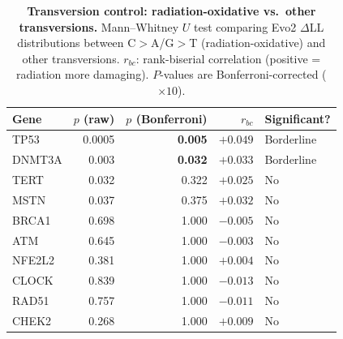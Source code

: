 \documentclass[11pt]{article}
\begin{document}
\begin{table}[h]
  \centering
  \caption{\textbf{Transversion control: radiation-oxidative vs.\ other transversions.}
    Mann--Whitney $U$ test comparing Evo2 $\Delta$LL distributions between
    C$>$A/G$>$T (radiation-oxidative) and other transversions. $r_{bc}$: rank-biserial
    correlation (positive = radiation more damaging). $P$-values are Bonferroni-corrected
    ($\times 10$).}
  \label{tab:transversion}
  \small
  \begin{tabular}{lrrrl}
    \toprule
    Gene & $p$ (raw) & $p$ (Bonferroni) & $r_{bc}$ & Significant? \\
    \midrule
    TP53   & 0.0005 & \textbf{0.005} & $+0.049$ & Borderline \\
    DNMT3A & 0.003  & \textbf{0.032} & $+0.033$ & Borderline \\
    TERT   & 0.032  & 0.322          & $+0.025$ & No \\
    MSTN   & 0.037  & 0.375          & $+0.032$ & No \\
    BRCA1  & 0.698  & 1.000          & $-0.005$ & No \\
    ATM    & 0.645  & 1.000          & $-0.003$ & No \\
    NFE2L2 & 0.381  & 1.000          & $+0.004$ & No \\
    CLOCK  & 0.839  & 1.000          & $-0.013$ & No \\
    RAD51  & 0.757  & 1.000          & $-0.011$ & No \\
    CHEK2  & 0.268  & 1.000          & $+0.009$ & No \\
    \bottomrule
  \end{tabular}
\end{table}



\end{document}
